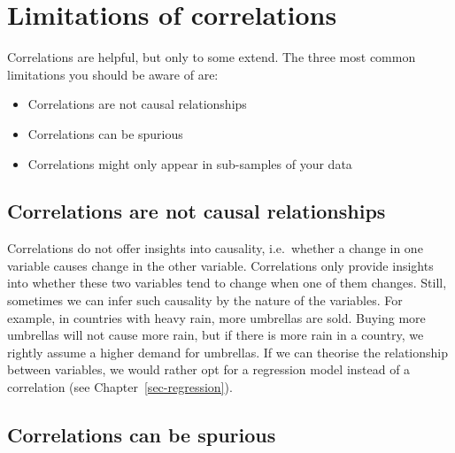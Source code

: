 \documentclass[
  letterpaper,
]{krantz}
\begin{document}
\section{Limitations of
correlations}\label{sec-limitations-of-correlations}

Correlations are helpful, but only to some extend. The three most common
limitations you should be aware of are:

\begin{itemize}
\item
  Correlations are not causal relationships
\item
  Correlations can be spurious
\item
  Correlations might only appear in sub-samples of your data
\end{itemize}

\subsection{Correlations are not causal
relationships}\label{sec-correlations-are-not-causal-relationships}

Correlations do not offer insights into causality, i.e.~whether a change
in one variable causes change in the other variable. Correlations only
provide insights into whether these two variables tend to change when
one of them changes. Still, sometimes we can infer such causality by the
nature of the variables. For example, in countries with heavy rain, more
umbrellas are sold. Buying more umbrellas will not cause more rain, but
if there is more rain in a country, we rightly assume a higher demand
for umbrellas. If we can theorise the relationship between variables, we
would rather opt for a regression model instead of a correlation (see
Chapter~\ref{sec-regression}).

\subsection{Correlations can be
spurious}\label{sec-correlations-can-be-spurious}
\end{document}
